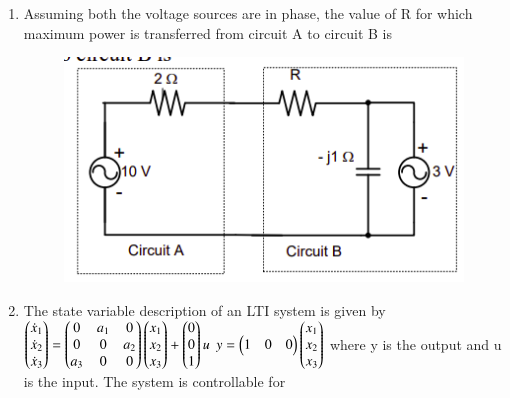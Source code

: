 \documentclass[journal,12pt,onecolumn]{IEEEtran}
\theoremstyle{remark}
\begin{document}
\begin{enumerate}[start=1, label=Q.\arabic*]
\begin{enumerate}
\end{enumerate}
\hfill{}

\item Assuming both the voltage sources are in phase, the value of R for which maximum power is transferred from circuit A to circuit B is
\begin{figure}[H]
    \centering
    \includegraphics[width=0.5\columnwidth]{Figures/q40.png}
    \caption{}
\end{figure}

\begin{enumerate}
\end{enumerate}
\hfill{}

\item The state variable description of an LTI system is given by
$\begin{pmatrix}\dot{x}_{1} \\ \dot{x}_{2} \\ \dot{x}_{3}\end{pmatrix}=\begin{pmatrix}0 & a_{1} & 0 \\ 0 & 0 & a_{2} \\ a_{3} & 0 & 0\end{pmatrix}\begin{pmatrix}x_{1} \\ x_{2} \\ x_{3}\end{pmatrix}+\begin{pmatrix}0 \\ 0 \\ 1\end{pmatrix}u$
$y=\begin{pmatrix}1 & 0 & 0\end{pmatrix}\begin{pmatrix}x_{1} \\ x_{2} \\ x_{3}\end{pmatrix}$
where y is the output and u is the input. The system is controllable for


\end{enumerate}
\end{document}
